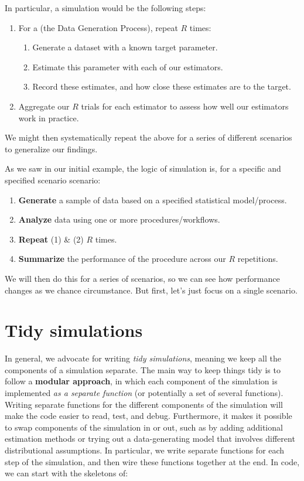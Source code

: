 \documentclass[
]{book}
\begin{document}
In particular, a simulation would be the following steps:\\

\begin{enumerate}
\item For a  (the Data Generation Process), repeat $R$ times:
\begin{enumerate}
    \item Generate a dataset with a known target parameter.  
    \item Estimate this parameter with each of our estimators.
    \item Record these estimates, and how close these estimates are to the target.
\end{enumerate}
\item Aggregate our $R$ trials for each estimator to assess how well our estimators work in practice.
\end{enumerate}

We might then systematically repeat the above for a series of different scenarios to generalize our findings.

As we saw in our initial example, the logic of simulation is, for a specific and specified scenario scenario:

\begin{enumerate}
\def\labelenumi{\arabic{enumi}.}
\item
  \textbf{Generate} a sample of data based on a specified statistical model/process.
\item
  \textbf{Analyze} data using one or more procedures/workflows.
\item
  \textbf{Repeat} (1) \& (2) \(R\) times.
\item
  \textbf{Summarize} the performance of the procedure across our \(R\) repetitions.
\end{enumerate}

We will then do this for a series of scenarios, so we can see how performance changes as we chance circumstance.
But first, let's just focus on a single scenario.

\hypertarget{tidy-simulations}{%
\section{Tidy simulations}\label{tidy-simulations}}

In general, we advocate for writing \emph{tidy simulations}, meaning we keep all the components of a simulation separate.
The main way to keep things tidy is to follow a \textbf{modular approach}, in which each component of the simulation is implemented \emph{as a separate function} (or potentially a set of several functions).
Writing separate functions for the different components of the simulation will make the code easier to read, test, and debug.
Furthermore, it makes it possible to swap components of the simulation in or out, such as by adding additional estimation methods or trying out a data-generating model that involves different distributional assumptions.
In particular, we write separate functions for each step of the simulation, and then wire these functions together at the end.
In code, we can start with the skeletons of:
\end{document}
